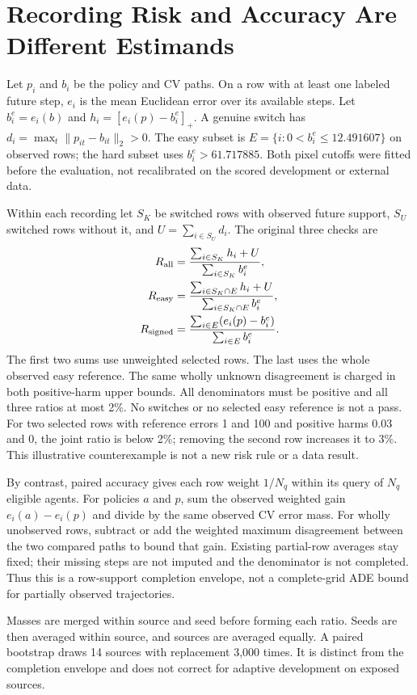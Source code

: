 \documentclass[10pt,twocolumn,letterpaper]{article}
\begin{document}
\section{Recording Risk and Accuracy Are Different Estimands}
Let $p_i$ and $b_i$ be the policy and CV paths. On a row
with at least one labeled future step, $e_i$ is the mean
Euclidean error over its available steps. Let $b_i^e=e_i(b)$
and $h_i=[e_i(p)-b_i^e]_+$. A genuine switch has
$d_i=\max_t\|p_{it}-b_{it}\|_2>0$. The easy subset is
$E=\{i:0<b_i^e\leq 12.491607\}$ on observed rows;
the hard subset uses $b_i^e>61.717885$. Both pixel cutoffs
were fitted before the evaluation, not recalibrated on the
scored development or external data.

Within each recording let $S_K$ be switched rows with
observed future support, $S_U$ switched rows without it, and
$U=\sum_{i\in S_U}d_i$. The original three checks are
\begin{align*}
R_{\rm all} &= \frac{\sum_{i\in S_K} h_i+U}{\sum_{i\in S_K} b_i^e},\\
R_{\rm easy} &= \frac{\sum_{i\in S_K\cap E}h_i+U}
                     {\sum_{i\in S_K\cap E}b_i^e},\\
R_{\rm signed} &= \frac{\sum_{i\in E}(e_i(p)-b_i^e)}
                       {\sum_{i\in E}b_i^e}.
\end{align*}
The first two sums use unweighted selected rows. The last uses
the whole observed easy reference. The same wholly unknown
disagreement is charged in both positive-harm upper bounds.
All denominators must be positive and all three ratios at most
2\%. No switches or no selected easy reference is not a pass.
For two selected rows with reference errors 1 and 100 and
positive harms 0.03 and 0, the joint ratio is below 2\%;
removing the second row increases it to 3\%. This illustrative
counterexample is not a new risk rule or a data result.

By contrast, paired accuracy gives each row weight $1/N_q$
within its query of $N_q$ eligible agents. For policies $a$
and $p$, sum the observed weighted gain $e_i(a)-e_i(p)$
and divide by the same observed CV error mass. For wholly
unobserved rows, subtract or add the weighted maximum
disagreement between the two compared paths to bound that
gain. Existing partial-row averages stay fixed; their missing
steps are not imputed and the denominator is not completed.
Thus this is a row-support completion envelope, not a
complete-grid ADE bound for partially observed trajectories.

Masses are merged within source and seed before forming each
ratio. Seeds are then averaged within source, and sources
are averaged equally. A paired bootstrap draws 14 sources
with replacement 3,000 times. It is distinct from the
completion envelope and does not correct for adaptive
development on exposed sources.
\end{document}
